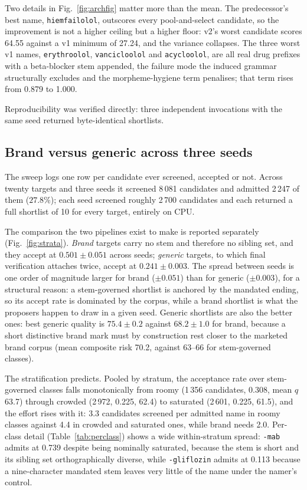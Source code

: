 \documentclass[conference]{IEEEtran}
\newcommand{\code}[1]{\texttt{\footnotesize #1}}
\begin{document}
Two details in Fig.~\ref{fig:archfig} matter more than the mean. The
predecessor's best name, \code{hiemfailolol}, outscores every pool-and-select
candidate, so the improvement is not a higher ceiling but a higher floor: v2's
worst candidate scores 64.55 against a v1 minimum of 27.24, and the variance
collapses. The three worst v1 names, \code{erythroolol}, \code{vancicloolol} and
\code{acycloolol}, are all real drug prefixes with a beta-blocker stem appended,
the failure mode the induced grammar structurally excludes and the
morpheme-hygiene term penalises; that term rises from 0.879 to 1.000.

Reproducibility was verified directly: three independent invocations with the
same seed returned byte-identical shortlists.

\subsection{Brand versus generic across three seeds}
\label{sec:res:sweep}

The sweep logs one row per candidate ever screened, accepted or not. Across
twenty targets and three seeds it screened 8\,081 candidates and admitted
2\,247 of them ($27.8\%$); each seed screened roughly 2\,700 candidates and
each returned a full shortlist of 10 for every target, entirely on CPU.

The comparison the two pipelines exist to make is reported separately
(Fig.~\ref{fig:strata}). \emph{Brand} targets carry no stem and therefore no
sibling set, and they accept at $0.501 \pm 0.051$ across seeds; \emph{generic}
targets, to which final verification attaches twice, accept at $0.241 \pm
0.003$. The spread between seeds is one order of magnitude larger for brand
($\pm 0.051$) than for generic ($\pm 0.003$), for a structural reason: a
stem-governed shortlist is anchored by the mandated ending, so its accept rate
is dominated by the corpus, while a brand shortlist is what the proposers
happen to draw in a given seed. Generic shortlists are also the better ones:
best generic quality is $75.4 \pm 0.2$ against $68.2 \pm 1.0$ for brand, because
a short distinctive brand mark must by construction rest closer to the marketed
brand corpus (mean composite risk 70.2, against 63--66 for stem-governed
classes).

The stratification predicts. Pooled by stratum, the acceptance rate over
stem-governed classes falls monotonically from roomy (1\,356 candidates, 0.308,
mean $q$ 63.7) through crowded (2\,972, 0.225, 62.4) to saturated (2\,601, 0.225,
61.5), and the effort rises with it: 3.3 candidates screened per admitted name
in roomy classes against 4.4 in crowded and saturated ones, while brand needs
2.0. Per-class detail (Table~\ref{tab:perclass}) shows a wide within-stratum
spread: \code{-mab} admits at 0.739 despite being nominally saturated, because
the stem is short and its sibling set orthographically diverse, while
\code{-gliflozin} admits at 0.113 because a nine-character mandated stem leaves
very little of the name under the namer's control.
\end{document}
